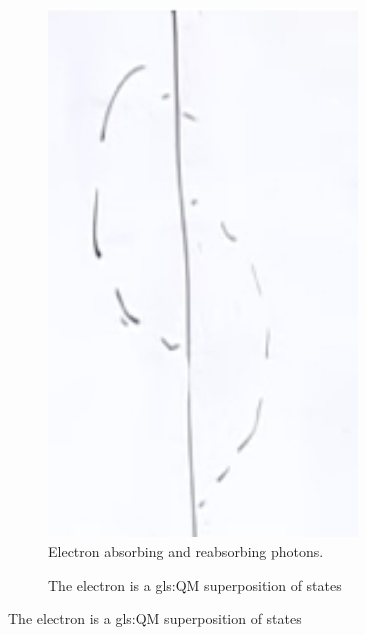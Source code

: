 \documentclass[]{article}
\begin{document}
\begin{figure}[H]
	\caption{Emission and absorption of photons}
	\begin{subfigure}[t]{0.45\textwidth}
		\caption{Electron absorbing and reabsorbing photons.}
		\includegraphics[width=0.9\textwidth]{2-1-electron-photons0}
	\end{subfigure}
	\hfill
	\begin{subfigure}[t]{0.45\textwidth}
		\caption{The electron is a \gls{gls:QM} superposition of states}\label{fig:2-1-electron-photons}

\end{subfigure}
\end{figure}
\end{document}
